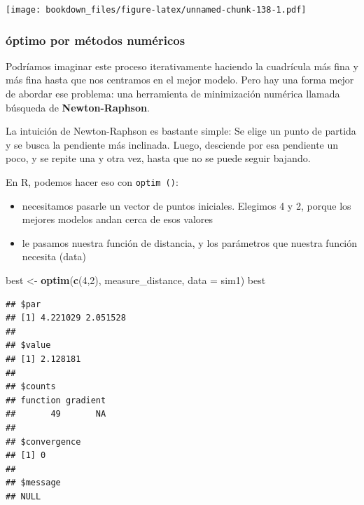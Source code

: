 \documentclass[]{book}
\newenvironment{Shaded}{\begin{snugshade}}{\end{snugshade}}
\newcommand{\DataTypeTok}[1]{\textcolor[rgb]{0.13,0.29,0.53}{#1}}
\newcommand{\DecValTok}[1]{\textcolor[rgb]{0.00,0.00,0.81}{#1}}
\newcommand{\KeywordTok}[1]{\textcolor[rgb]{0.13,0.29,0.53}{\textbf{#1}}}
\newcommand{\NormalTok}[1]{#1}
\newcommand{\OperatorTok}[1]{\textcolor[rgb]{0.81,0.36,0.00}{\textbf{#1}}}
\newcommand{\StringTok}[1]{\textcolor[rgb]{0.31,0.60,0.02}{#1}}
\providecommand{\tightlist}{%
  \setlength{\itemsep}{0pt}\setlength{\parskip}{0pt}}
\begin{document}
\texttt{[image: bookdown\_files/figure-latex/unnamed-chunk-138-1.pdf]}

\hypertarget{optimo-por-metodos-numericos}{%
\subsubsection{óptimo por métodos numéricos}\label{optimo-por-metodos-numericos}}

Podríamos imaginar este proceso iterativamente haciendo la cuadrícula más fina y más fina hasta que nos centramos en el mejor modelo. Pero hay una forma mejor de abordar ese problema: una herramienta de minimización numérica llamada búsqueda de \textbf{Newton-Raphson}.

La intuición de Newton-Raphson es bastante simple: Se elige un punto de partida y se busca la pendiente más inclinada. Luego, desciende por esa pendiente un poco, y se repite una y otra vez, hasta que no se puede seguir bajando.

En R, podemos hacer eso con \texttt{optim\ ()}:

\begin{itemize}
\tightlist
\item
  necesitamos pasarle un vector de puntos iniciales. Elegimos 4 y 2, porque los mejores modelos andan cerca de esos valores
\item
  le pasamos nuestra función de distancia, y los parámetros que nuestra función necesita (data)
\end{itemize}

\begin{Shaded}
\begin{Highlighting}[]
\NormalTok{best <-}\StringTok{ }\KeywordTok{optim}\NormalTok{(}\KeywordTok{c}\NormalTok{(}\DecValTok{4}\NormalTok{,}\DecValTok{2}\NormalTok{), measure_distance, }\DataTypeTok{data =}\NormalTok{ sim1)}
\NormalTok{best}
\end{Highlighting}
\end{Shaded}

\begin{verbatim}
## $par
## [1] 4.221029 2.051528
## 
## $value
## [1] 2.128181
## 
## $counts
## function gradient 
##       49       NA 
## 
## $convergence
## [1] 0
## 
## $message
## NULL
\end{verbatim}

\begin{Shaded}
\end{Shaded}
\end{document}
